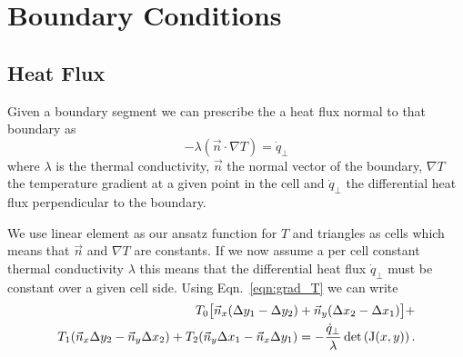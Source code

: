 \chapter{Boundary Conditions}

\section{Heat Flux}
Given a boundary segment we can prescribe the a heat flux normal to that boundary as
\begin{equation}
	-\lambda \left(\vec{n} \cdot \nabla T \right) = \dot{q}_{\perp}
\end{equation}
where $\lambda$ is the thermal conductivity, $\vec{n}$ the normal vector of the boundary, $\nabla T$ the temperature gradient at a given point in the cell and $\dot{q}_{\perp}$ the differential heat flux perpendicular to the boundary.

We use linear element as our ansatz function for $T$ and triangles as cells which means that $\vec{n}$ and $\nabla T$ are constants.
If we now assume a per cell constant thermal conductivity $\lambda$ this means that the differential heat flux $\dot{q}_{\perp}$ must be constant over a given cell side.
Using  Eqn.~\ref{eqn:grad_T} we can write
\begin{equation}
	\begin{split}
	T_0 \big[\vec{n}_x (\Delta y_1 - \Delta y_2) +  \vec{n}_y (\Delta x_2 - \Delta x_1) \big] +\\
	 T_1 (\vec{n}_x \Delta y_2 - \vec{n}_y \Delta x_2) +
	 T_2 (\vec{n}_y \Delta x_1 - \vec{n}_x \Delta y_1) 
	 =  -\frac{\dot{q}_{\perp}}{\lambda}\det\left( \mathrm{J}(x, y) \right).
	 \end{split}
\end{equation}

